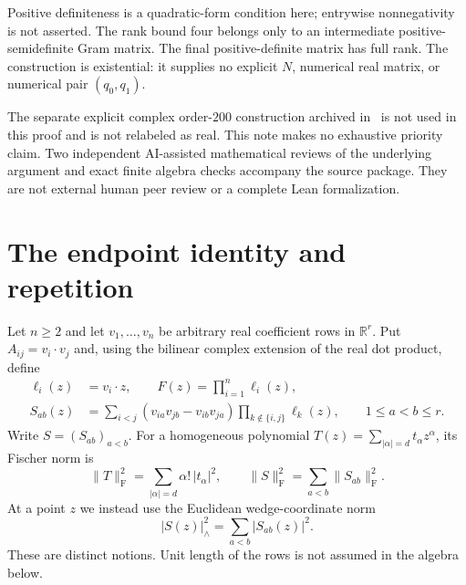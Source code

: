 \documentclass[11pt]{article}
\theoremstyle{remark}
\newcommand{\R}{\mathbb R}
\newcommand{\normF}[1]{\lVert #1\rVert_{\mathrm F}}
\newcommand{\normW}[1]{\lvert #1\rvert_{\wedge}}
\begin{document}
Positive definiteness is a quadratic-form condition here; entrywise nonnegativity is not asserted. The rank bound four belongs only to an intermediate positive-semidefinite Gram matrix. The final positive-definite matrix has full rank. The construction is existential: it supplies no explicit $N$, numerical real matrix, or numerical pair $(q_0,q_1)$.

The separate explicit complex order-$200$ construction archived in~\cite{ComplexArchive} is not used in this proof and is not relabeled as real. This note makes no exhaustive priority claim. Two independent AI-assisted mathematical reviews of the underlying argument and exact finite algebra checks accompany the source package. They are not external human peer review or a complete Lean formalization.

\section{The endpoint identity and repetition}
Let $n\geq2$ and let $v_1,\ldots,v_n$ be arbitrary real coefficient rows in $\R^r$. Put $A_{ij}=v_i\cdot v_j$ and, using the bilinear complex extension of the real dot product, define
\begin{align}
 \ell_i(z)&=v_i\cdot z,\qquad F(z)=\prod_{i=1}^n\ell_i(z),\label{eq:forms}\\
 S_{ab}(z)&=\sum_{i<j}(v_{ia}v_{jb}-v_{ib}v_{ja})
                  \prod_{k\notin\{i,j\}}\ell_k(z),\qquad 1\leq a<b\leq r.
 \label{eq:wedge}
\end{align}
Write $S=(S_{ab})_{a<b}$. For a homogeneous polynomial $T(z)=\sum_{|\alpha|=d}t_\alpha z^\alpha$, its Fischer norm is
\[
 \normF{T}^2=\sum_{|\alpha|=d}\alpha!\,|t_\alpha|^2,
 \qquad \normF{S}^2=\sum_{a<b}\normF{S_{ab}}^2.
\]
At a point $z$ we instead use the Euclidean wedge-coordinate norm
\[
 \normW{S(z)}^2=\sum_{a<b}|S_{ab}(z)|^2.
\]
These are distinct notions. Unit length of the rows is not assumed in the algebra below.
\end{document}
